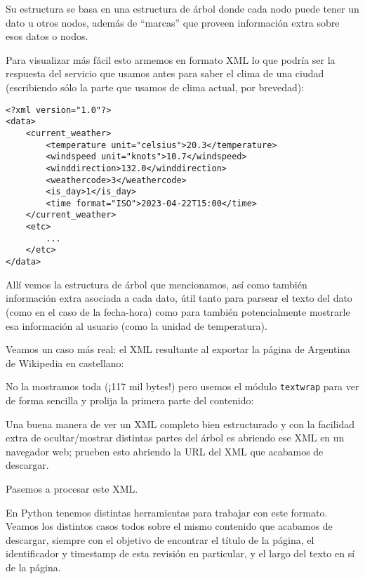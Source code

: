 Su estructura se basa en una estructura de árbol donde cada nodo puede tener un dato u otros nodos, además de ``marcas'' que proveen información extra sobre esos datos o nodos. 

Para visualizar más fácil esto armemos en formato XML lo que podría ser la respuesta del servicio que usamos antes para saber el clima de una ciudad (escribiendo sólo la parte que usamos de clima actual, por brevedad):

\begin{verbatim}
<?xml version="1.0"?>
<data>
    <current_weather>
        <temperature unit="celsius">20.3</temperature>
        <windspeed unit="knots">10.7</windspeed>
        <winddirection>132.0</winddirection>
        <weathercode>3</weathercode>
        <is_day>1</is_day>
        <time format="ISO">2023-04-22T15:00</time>
    </current_weather>
    <etc> 
        ... 
    </etc>
</data>
\end{verbatim}

Allí vemos la estructura de árbol que mencionamos, así como también información extra asociada a cada dato, útil tanto para parsear el texto del dato (como en el caso de la fecha-hora) como para también potencialmente mostrarle esa información al usuario (como la unidad de temperatura).

Veamos un caso más real: el XML resultante al exportar la página de Argentina de Wikipedia en castellano:


No la mostramos toda (¡117 mil bytes!) pero usemos el módulo \texttt{textwrap} para ver de forma sencilla y prolija la primera parte del contenido:


\begin{info}
    Una buena manera de ver un XML completo bien estructurado y con la facilidad extra de ocultar/mostrar distintas partes del árbol es abriendo ese XML en un navegador web; prueben esto abriendo la URL del XML que acabamos de descargar.
\end{info}

Pasemos a procesar este XML.

En Python tenemos distintas herramientas para trabajar con este formato. Veamos los distintos casos todos sobre el mismo contenido que acabamos de descargar, siempre con el objetivo de encontrar el título de la página, el identificador y timestamp de esta revisión en particular, y el largo del texto en sí de la página.

